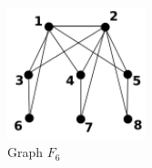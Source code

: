  \begin{figure}[htb]	
 \center%
 \includegraphics[width=4cm]{./img/f6.png}
 \caption{Graph $F_6$}
\label{fig:f6}
\end{figure}  
 